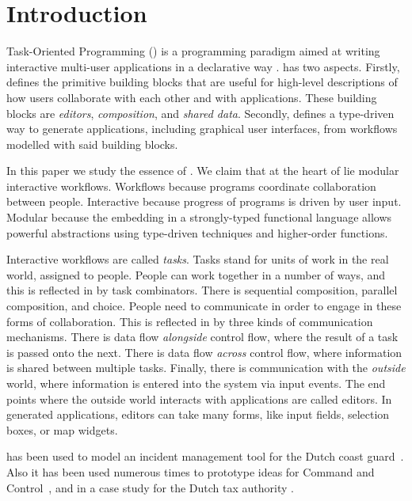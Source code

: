 


\section{Introduction}

Task-Oriented Programming (\TOP) is a programming paradigm aimed at writing interactive multi-user applications in a declarative way \cite{conf/ppdp/PlasmeijerLMAK12}.
\TOP has two aspects.
Firstly, \TOP defines the primitive building blocks that are useful for high-level descriptions of how users collaborate with each other and with applications.
These building blocks are \emph{editors}, \emph{composition}, and \emph{shared data}.
Secondly, \TOP defines a type-driven way to generate applications, including graphical user interfaces, from workflows modelled with said building blocks.

In this paper we study the essence of \TOP.
We claim that at the heart of \TOP lie modular interactive workflows.
Workflows because \TOP programs coordinate collaboration between people.
Interactive because progress of \TOP programs is driven by user input.
Modular because the embedding in a strongly-typed functional language allows powerful abstractions using type-driven techniques and higher-order functions.

Interactive workflows are called \emph{tasks}.
Tasks stand for units of work in the real world, assigned to people.
People can work together in a number of ways, and this is reflected in \TOP by task combinators.
There is sequential composition, parallel composition, and choice.
People need to communicate in order to engage in these forms of collaboration.
This is reflected in \TOP by three kinds of communication mechanisms.
There is data flow \emph{alongside} control flow, where the result of a task is passed onto the next.
There is data flow \emph{across} control flow, where information is shared between multiple tasks.
Finally, there is communication with the \emph{outside} world, where information is entered into the system via input events.
The end points where the outside world interacts with \TOP applications are called editors.
In generated applications, editors can take many forms, like input fields, selection boxes, or map widgets.

\TOP has been used to model an incident management tool for the Dutch coast guard~\cite{conf/iscram/LijnseJP12}.
Also it has been used numerous times to prototype ideas for Command and Control~\cite{theses/nlda/Kool17, theses/radboud/Stutterheim17}, and in a case study for the Dutch tax authority \cite{conf/sfp/StutterheimAP17}.



